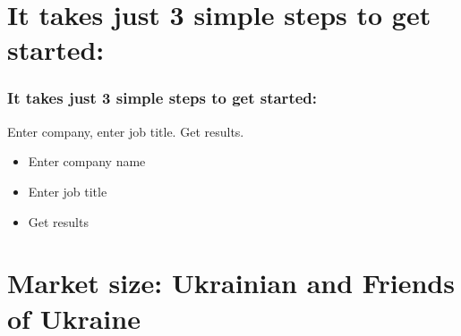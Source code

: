 \documentclass[aspectratio=169]{beamer}
\begin{document}
\section{It takes just 3 simple steps to get started:}

\begin{frame}
    \frametitle{It takes just 3 simple steps to get started:}
    
    \begin{block}{Enter company, enter job title. Get results.}
        \begin{itemize}
            \item Enter company name
            \item Enter job title
            \item Get results
        \end{itemize}
    \end{block}
    
\end{frame}

\section{Market size: Ukrainian and Friends of Ukraine}
\end{document}
